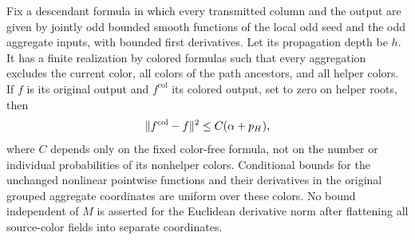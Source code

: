 \begin{lemma}
\label{lem:classical-color-exclusion}
Fix a descendant formula in which every transmitted column and the
output are given by jointly odd bounded smooth functions of the
local odd seed and the odd aggregate inputs, with bounded first
derivatives.  Let its
propagation depth be $h$.  It has a finite realization by colored
formulas such that every aggregation excludes the current color,
all colors of the path ancestors, and all helper colors.
If $f$ is its original output and $f^{\mathrm{col}}$ its colored
output, set to zero on helper roots, then
\begin{equation}
 \lVert f^{\mathrm{col}}-f\rVert^2\le C(\alpha+p_H),
 \label{eq:color-exclusion-bound}
\end{equation}
where $C$ depends only on the fixed color-free formula, not on the
number or individual probabilities of its nonhelper colors.
Conditional bounds for the unchanged nonlinear pointwise functions
and their derivatives in the original grouped aggregate coordinates
are uniform over these colors.  No bound independent of $M$ is
asserted for the Euclidean derivative norm after flattening all
source-color fields into separate coordinates.
\end{lemma}

